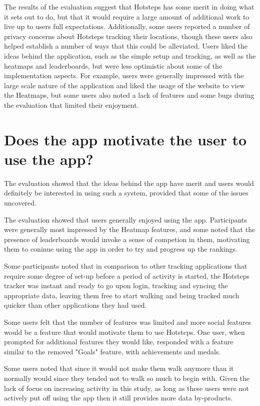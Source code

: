 \documentclass{l4proj}
\begin{document}
The results of the evaluation suggest that Hotsteps has some merit in doing what it sets out to do, but that it would require a large amount of additional work to live up to users full expectations. Additionally, some users reported a number of privacy concerns about Hotsteps tracking their locations, though these users also helped establish a number of ways that this could be alleviated. Users liked the ideas behind the application, such as the simple setup and tracking, as well as the heatmaps and leaderboards,  but were less optimistic about some of the implementation aspects. For example, users were generally impressed with the large scale nature of the application and liked the usage of the website to view the Heatmaps, but some users also noted a lack of features and some bugs during the evaluation that limited their enjoyment.

\section{Does the app motivate the user to use the app?}

The evaluation showed that the ideas behind the app have merit and users would definitely be interested in using such a system, provided that some of the issues uncovered.

The evaluation showed that users generally enjoyed using the app. Participants were generally most impressed by the Heatmap features, and some noted that the presence of leaderboards would invoke a sense of competion in them, motivating them to coninue using the app in order to try and progress up the rankings.

Some participants noted that in comparison to other tracking applications that require some degree of set-up before a period of activity is started, the Hotsteps tracker was instant and ready to go upon login, tracking and syncing the appropriate data, leaving them free to start walking and being tracked much quicker than other applications they had used. 

Some users felt that the number of features was limited and more social features would be a feature that would motivate them to use Hotsteps. One user, when prompted for additional features they would like, responded with a feature similar to the removed "Goals" feature, with achievements and medals.

Some users noted that since it would not make them walk anymore than it normally would since they tended not to walk so much to begin with. Given the lack of focus on increasing activity in this study, as long as these users were not actively put off using the app then it still provides more data by-products. 
\end{document}
